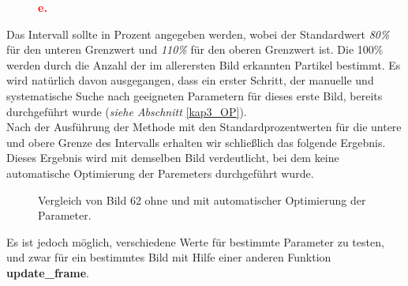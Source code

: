 \begin{figure}[H]
  \centering
  \begin{center}
  	\textcolor{red}{\textbf{{\large e.}}}
  \end{center}
  \label{fig:kap3_strukto_part_per_array_t5}
\end{figure}


Das Intervall sollte in Prozent angegeben werden, wobei der Standardwert \textit{80\%} für den unteren Grenzwert und \textit{110\%} für den oberen Grenzwert ist. Die 100\% werden durch die Anzahl der im allerersten Bild erkannten Partikel bestimmt. 
Es wird natürlich davon ausgegangen, dass ein erster Schritt, der manuelle und systematische Suche nach geeigneten Parametern für dieses erste Bild, bereits durchgeführt wurde (\textit{siehe Abschnitt} \ref{kap3_OP}).\\

Nach der Ausführung der Methode mit den Standardprozentwerten für die untere und obere Grenze des Intervalls erhalten wir schließlich das folgende Ergebnis. Dieses Ergebnis wird mit demselben Bild verdeutlicht, bei dem keine automatische Optimierung der Paremeters durchgeführt wurde.

\begin{figure}[H]
    \centering
    \caption{Vergleich von Bild 62 ohne und mit automatischer Optimierung der Parameter.}
    \label{fig:kap3_vergleich_Bild_62_mit_ohne}
\end{figure}
Es ist jedoch möglich, verschiedene Werte für bestimmte Parameter zu testen, und zwar für ein bestimmtes Bild mit Hilfe einer anderen Funktion \textbf{update\_frame}.


